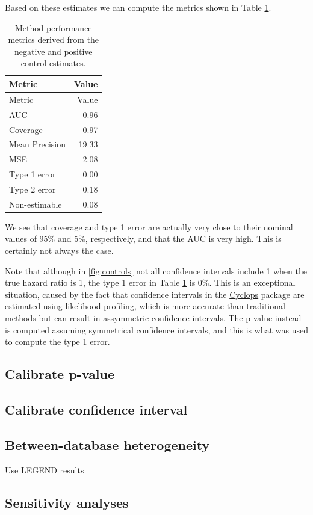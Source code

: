 \documentclass[]{book}
\begin{document}
Based on these estimates we can compute the metrics shown in Table
\ref{tab:exampleMetrics}.

\begin{longtable}[]{@{}lr@{}}
\caption{\label{tab:exampleMetrics} Method performance metrics derived from
the negative and positive control estimates.}\tabularnewline
\toprule
Metric & Value\tabularnewline
\midrule
\endfirsthead
\toprule
Metric & Value\tabularnewline
\midrule
\endhead
AUC & 0.96\tabularnewline
Coverage & 0.97\tabularnewline
Mean Precision & 19.33\tabularnewline
MSE & 2.08\tabularnewline
Type 1 error & 0.00\tabularnewline
Type 2 error & 0.18\tabularnewline
Non-estimable & 0.08\tabularnewline
\bottomrule
\end{longtable}

We see that coverage and type 1 error are actually very close to their
nominal values of 95\% and 5\%, respectively, and that the AUC is very
high. This is certainly not always the case.

Note that although in \ref{fig:controls} not all confidence intervals
include 1 when the true hazard ratio is 1, the type 1 error in Table
\ref{tab:exampleMetrics} is 0\%. This is an exceptional situation,
caused by the fact that confidence intervals in the
\href{https://ohdsi.github.io/Cyclops/}{Cyclops} package are estimated
using likelihood profiling, which is more accurate than traditional
methods but can result in assymmetric confidence intervals. The p-value
instead is computed assuming symmetrical confidence intervals, and this
is what was used to compute the type 1 error.

\subsection{Calibrate p-value}\label{calibrate-p-value}

\subsection{Calibrate confidence
interval}\label{calibrate-confidence-interval}

\subsection{Between-database
heterogeneity}\label{between-database-heterogeneity}

Use LEGEND results

\subsection{Sensitivity analyses}\label{sensitivity-analyses-1}
\end{document}
